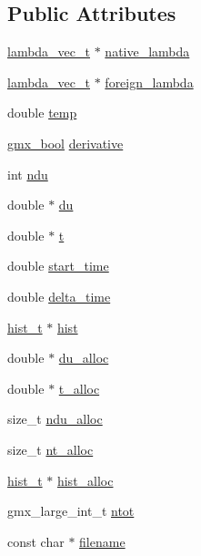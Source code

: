 \subsection*{\-Public \-Attributes}
\begin{DoxyCompactItemize}
\item 
\hyperlink{structlambda__vec__t}{lambda\-\_\-vec\-\_\-t} $\ast$ \hyperlink{structsamples__t_a241367f6475b2b0455ed08825f9c8430}{native\-\_\-lambda}
\item 
\hyperlink{structlambda__vec__t}{lambda\-\_\-vec\-\_\-t} $\ast$ \hyperlink{structsamples__t_a09296c3dba8f54341dd1b769e43b9d66}{foreign\-\_\-lambda}
\item 
double \hyperlink{structsamples__t_ab34a61611ceed2ae37c0daabc97709d1}{temp}
\item 
\hyperlink{include_2types_2simple_8h_a8fddad319f226e856400d190198d5151}{gmx\-\_\-bool} \hyperlink{structsamples__t_a3cf66613e04172f79715c361abbe2d70}{derivative}
\item 
int \hyperlink{structsamples__t_affcc416c4eed46c900632cadb7d63e14}{ndu}
\item 
double $\ast$ \hyperlink{structsamples__t_a0203a0e4b03745518f76f238a2404f18}{du}
\item 
double $\ast$ \hyperlink{structsamples__t_a375ee4f2346cf5fa003845318d77a707}{t}
\item 
double \hyperlink{structsamples__t_accc3059de38ab4b40cd7fbb66e14ae6b}{start\-\_\-time}
\item 
double \hyperlink{structsamples__t_a8f2dc6f752895b08e2c653404f97774a}{delta\-\_\-time}
\item 
\hyperlink{structhist__t}{hist\-\_\-t} $\ast$ \hyperlink{structsamples__t_a45bc8d740177c029249e592ed5a489e4}{hist}
\item 
double $\ast$ \hyperlink{structsamples__t_a8a976bae7499cff015eb9bbb25a5c934}{du\-\_\-alloc}
\item 
double $\ast$ \hyperlink{structsamples__t_af6f0f7b705ac9f0c6a574c28e2c5803e}{t\-\_\-alloc}
\item 
size\-\_\-t \hyperlink{structsamples__t_a8c7fa8bce9c30029c8dddc902e0d60dd}{ndu\-\_\-alloc}
\item 
size\-\_\-t \hyperlink{structsamples__t_a320fc44ee13d7527afe233378b974e28}{nt\-\_\-alloc}
\item 
\hyperlink{structhist__t}{hist\-\_\-t} $\ast$ \hyperlink{structsamples__t_aefd829677b81ad9e38fa6a5741eab7ce}{hist\-\_\-alloc}
\item 
gmx\-\_\-large\-\_\-int\-\_\-t \hyperlink{structsamples__t_a97579770a53c42c8ac731efab1cce68c}{ntot}
\item 
const char $\ast$ \hyperlink{structsamples__t_a06c9e2c3ff0e2392744acff953175d2f}{filename}
\end{DoxyCompactItemize}


